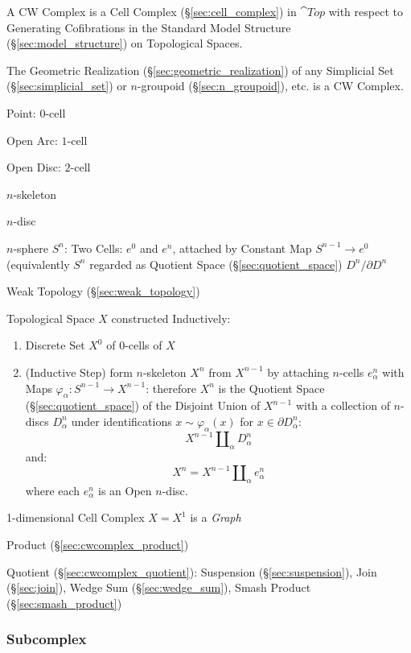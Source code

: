 A CW Complex is a Cell Complex (\S\ref{sec:cell_complex}) in $\cat{Top}$ with
respect to Generating Cofibrations in the Standard Model Structure
(\S\ref{sec:model_structure}) on Topological Spaces.

The Geometric Realization (\S\ref{sec:geometric_realization}) of any Simplicial
Set (\S\ref{sec:simplicial_set}) or $n$-groupoid (\S\ref{sec:n_groupoid}), etc.
is a CW Complex.

Point: $0$-cell

Open Arc: $1$-cell

Open Disc: $2$-cell

$n$-skeleton

$n$-disc

$n$-sphere $S^n$: Two Cells: $e^0$ and $e^n$, attached by Constant Map
$S^{n-1} \rightarrow e^0$ (equivalently $S^n$ regarded as Quotient
Space (\S\ref{sec:quotient_space}) $D^n/ \partial D^n$

Weak Topology (\S\ref{sec:weak_topology})

Topological Space $X$ constructed Inductively: \cite{hatcher02}
\begin{enumerate}
  \item Discrete Set $X^0$ of $0$-cells of $X$
  \item (Inductive Step) form $n$-skeleton $X^n$ from $X^{n-1}$ by
    attaching $n$-cells $e^n_\alpha$ with Maps $\varphi_\alpha :
    S^{n-1} \rightarrow X^{n-1}$: therefore $X^n$ is the Quotient
    Space (\S\ref{sec:quotient_space}) of the Disjoint Union of
    $X^{n-1}$ with a collection of $n$-discs $D^n_\alpha$ under
    identifications $x \sim \varphi_\alpha(x)$ for $x \in \partial
    D^n_\alpha$:
    \[
      X^{n-1}\amalg_\alpha D^n_\alpha
    \]
    and:
    \[
      X^n = X^{n-1}\amalg_\alpha e^n_\alpha
    \]
    where each $e^n_\alpha$ is an Open $n$-disc.
\end{enumerate}

1-dimensional Cell Complex $X = X^1$ is a \emph{Graph}

Product (\S\ref{sec:cwcomplex_product})

Quotient (\S\ref{sec:cwcomplex_quotient}): Suspension
(\S\ref{sec:suspension}), Join (\S\ref{sec:join}), Wedge Sum
(\S\ref{sec:wedge_sum}), Smash Product (\S\ref{sec:smash_product})



\subsubsection{Subcomplex}\label{sec:subcomplex}

